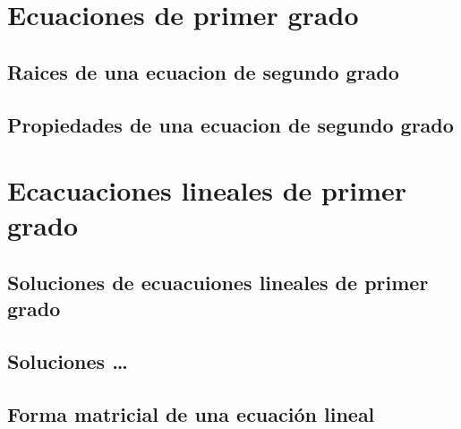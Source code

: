 \documentclass[10pt,]{krantz}
\theoremstyle{definition}
\theoremstyle{definition}
\theoremstyle{definition}
\theoremstyle{remark}
\begin{document}
\hypertarget{ecuaciones-de-primer-grado}{%
\chapter{Ecuaciones de primer grado}\label{ecuaciones-de-primer-grado}}

\citep{xie2015}

\hypertarget{raices-de-una-ecuacion-de-segundo-grado}{%
\section{Raices de una ecuacion de segundo grado}\label{raices-de-una-ecuacion-de-segundo-grado}}

\hypertarget{propiedades-de-una-ecuacion-de-segundo-grado}{%
\section{Propiedades de una ecuacion de segundo grado}\label{propiedades-de-una-ecuacion-de-segundo-grado}}

\hypertarget{ecacuaciones-lineales-de-primer-grado}{%
\chapter{Ecacuaciones lineales de primer grado}\label{ecacuaciones-lineales-de-primer-grado}}

\hypertarget{soluciones-de-ecuacuiones-lineales-de-primer-grado}{%
\section{Soluciones de ecuacuiones lineales de primer grado}\label{soluciones-de-ecuacuiones-lineales-de-primer-grado}}

\hypertarget{soluciones}{%
\section{Soluciones \ldots{}}\label{soluciones}}

\hypertarget{forma-matricial-de-una-ecuaciuxf3n-lineal}{%
\section{Forma matricial de una ecuación lineal}\label{forma-matricial-de-una-ecuaciuxf3n-lineal}}



\printindex
\end{document}

